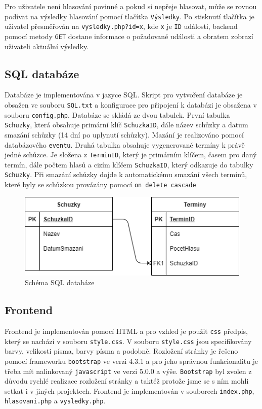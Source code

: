 \documentclass[11pt, a4paper]{article}
\begin{document}
Pro uživatele není hlasování povinné a pokud si nepřeje hlasovat, může se rovnou podívat na výsledky hlasování pomocí tlačítka \texttt{Výsledky}. Po stisknutí tlačítka je uživatel přesměřován na \texttt{vysledky.php?id=x}, kde \texttt{x} je \texttt{ID} události, backend pomocí metody \texttt{GET} dostane informace o požadované události a obratem zobrazí uživateli aktuální výsledky.  

\subsection{SQL databáze}
Databáze je implementována v jazyce SQL. Skript pro vytvoření databáze je obsažen ve souboru \texttt{SQL.txt} a konfigurace pro připojení k databázi je obsažena v souboru \texttt{config.php}. Databáze se skládá ze dvou tabulek. První tabulka \texttt{Schuzky}, která obsahuje primární klíč \texttt{SchuzkaID}, dále název schůzky a datum smazání schůzky (14 dní po uplynutí schůzky). Mazání je realizováno pomocí databázového \texttt{eventu}. Druhá tabulka obsahuje vygenerované termíny k právě jedné schůzce. Je složena z \texttt{TerminID}, který je primárním klíčem, časem pro daný termín, dále počtem hlasů a cizím klíčem \texttt{SchuzkaID}, který odkazuje do tabulky \texttt{Schuzky}. Při smazání schůzky dojde k automatickému smazání všech termínů, které byly se schůzkou provázány pomocí \texttt{on delete cascade} 

\begin{figure}[H]
\begin{center}
\includegraphics[scale=0.6]{dbDiagram.png}
\caption{Schéma SQL databáze}
\label{obr1}
\end{center}
\end{figure}
\subsection{Frontend}
Frontend je implementován pomocí HTML a pro vzhled je použit \texttt{css} předpis, který se nachází v souboru \texttt{style.css}. V souboru \texttt{style.css} jsou specifikovány barvy, velikosti písma, barvy písma a podobně. Rozložení stránky je řešeno pomocí frameworku \texttt{bootstrap} ve verzi 4.3.1 a pro jeho správnou funkcionalitu je třeba mít nalinkovaný \texttt{javascript} ve verzi 5.0.0 a výše. \texttt{Bootstrap} byl zvolen z důvodu rychlé realizace rozložení stránky a taktéž protože jsme se s ním mohli setkat i v jiných projektech. Frontend je implementován v souborech \texttt{index.php}, \texttt{hlasovani.php} a \texttt{vysledky.php}. 
\end{document}
